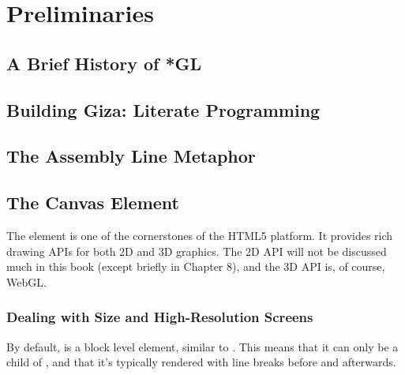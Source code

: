 \chapter{Preliminaries}

\section{A Brief History of *GL}

\section{Building Giza: Literate Programming}

\section{The Assembly Line Metaphor}

\section{The Canvas Element}

The  element is one of the cornerstones of the HTML5 platform.  It provides rich drawing APIs for both 2D and 3D graphics.  The 2D API will not be discussed much in this book (except briefly in Chapter 8), and the 3D API is, of course, WebGL.

\subsection{Dealing with Size and High-Resolution Screens}

By default,  is a block level element, similar to .  This means that it can only be a child of , and that it's typically rendered with line breaks before and afterwards.

